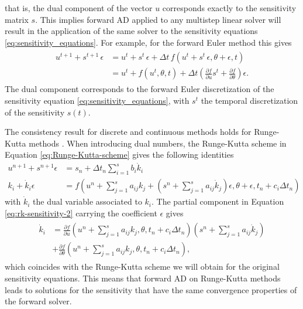 that is, the dual component of the vector $u$ corresponds exactly to the sensitivity matrix $s$. 
This implies forward AD applied to any multistep linear solver will result in the application of the same solver to the sensitivity equations \eqref{eq:sensitivity_equations}.  
For example, for the forward Euler method this gives 
\begin{align}
\begin{split}
    u^{t+1} + s^{t+1} \, \epsilon 
    &= 
    u^t +  s^t \, \epsilon + \Delta t \, f (u^t + s^t \, \epsilon, \theta + \epsilon, t) \\
    &= 
    u^t + f(u^t, \theta, t) 
    + 
    \Delta t 
    \left( 
    \frac{\partial f}{\partial u} s^t + 
    \frac{\partial f}{\partial \theta}
    \right) \epsilon.
\end{split}
\label{eq:sensitivity-equation-AD}
\end{align}
The dual component corresponds to the forward Euler discretization of the sensitivity equation \eqref{eq:sensitivity_equations}, with $s^t$ the temporal discretization of the sensitivity $s(t)$.

The consistency result for discrete and continuous methods holds for Runge-Kutta methods \cite{Walther_2007}. 
When introducing dual numbers, the Runge-Kutta scheme in Equation \eqref{eq:Runge-Kutta-scheme} gives the following identities
\begin{align}
    u^{n+1} + s^{n+1} \epsilon 
    &= 
    s_n + \Delta t_n \sum_{i=1}^s b_i \dot k_i
    \\
    k_i + \dot k_i \epsilon
    &= 
    f \left(u^n + \sum_{j=1}^s a_{ij} k_j + \left( s^n + \sum_{j=1}^s a_{ij} \dot k_j \right) \epsilon , \theta + \epsilon ,  t_n + c_i \Delta t_n \right) \label{eq:rk-sensitivity-2}
\end{align}
with $\dot k_i$ the dual variable associated to $k_i$.
The partial component in Equation \eqref{eq:rk-sensitivity-2} carrying the coefficient $\epsilon$ gives 
\begin{align}
\begin{split}
    \dot k_i
    &= 
    \frac{\partial f}{\partial u} 
    \left(u^n + \sum_{j=1}^s a_{ij} k_j, \theta,  t_n + c_i \Delta t_n \right)
    \left( s^n + \sum_{j=1}^s a_{ij} \dot k_j \right) \\
    &+ 
    \frac{\partial f}{\partial \theta} 
    \left(u^n + \sum_{j=1}^s a_{ij} k_j, \theta,  t_n + c_i \Delta t_n \right),
\end{split}
\end{align}
which coincides with the Runge-Kutta scheme we will obtain for the original sensitivity equations. 
This means that forward AD on Runge-Kutta methods leads to solutions for the sensitivity that have the same convergence properties of the forward solver. 

